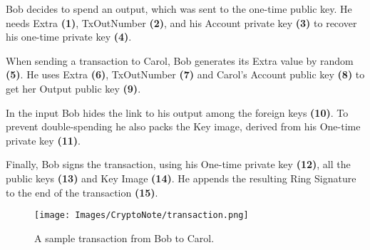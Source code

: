 Bob decides to spend an output, which was sent to the one-time public key. He needs Extra \textbf{(1)}, TxOutNumber \textbf{(2)}, and his Account private key \textbf{(3)} to recover his one-time private key \textbf{(4)}.

When sending a transaction to Carol, Bob generates its Extra value by random \textbf{(5)}. He uses Extra \textbf{(6)}, TxOutNumber \textbf{(7)} and Carol's Account public key \textbf{(8)} to get her Output public key \textbf{(9)}.

In the input Bob hides the link to his output among the foreign keys \textbf{(10)}. To prevent double-spending he also packs the Key image, derived from his One-time private key \textbf{(11)}.

Finally, Bob signs the transaction, using his One-time private key \textbf{(12)}, all the public keys \textbf{(13)} and Key Image \textbf{(14)}. He appends the resulting Ring Signature to the end of the transaction \textbf{(15)}.
\clearpage
\pagebreak

\begin{figure}[ht]
  \centering
  \texttt{[image: Images/CryptoNote/transaction.png]}
  \caption{A sample transaction from Bob to Carol.~\cite{cryptonote}}
  \label{fig:transaction}
\end{figure}
